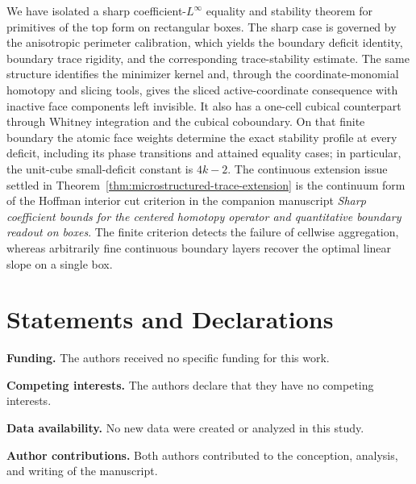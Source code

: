 \documentclass[11pt,letterpaper]{article}
\numberwithin{equation}{section}
\theoremstyle{plain}
\theoremstyle{definition}
\theoremstyle{remark}
\begin{document}
We have isolated a sharp coefficient-$L^\infty$ equality and stability theorem
for primitives of the top form on rectangular boxes. The sharp case is governed
by the anisotropic perimeter calibration, which yields the boundary deficit
identity, boundary trace rigidity, and the corresponding trace-stability
estimate. The same structure identifies the minimizer kernel and, through the
coordinate-monomial homotopy and slicing tools, gives the sliced
active-coordinate consequence with inactive face components left invisible. It
also has a one-cell cubical counterpart through Whitney integration and the
cubical coboundary. On that finite boundary the atomic face weights determine
the exact stability profile at every deficit, including its phase transitions
and attained equality cases; in particular, the unit-cube small-deficit
constant is $4k-2$.  The continuous extension issue settled in
Theorem~\ref{thm:microstructured-trace-extension} is the continuum form of the
Hoffman interior cut criterion in the companion manuscript
\emph{Sharp coefficient bounds for the centered homotopy operator and
quantitative boundary readout on boxes}.  The finite criterion detects the
failure of cellwise aggregation, whereas arbitrarily fine continuous boundary
layers recover the optimal linear slope on a single box.

\section*{Statements and Declarations}

\noindent\textbf{Funding.} The authors received no specific funding for this work.

\noindent\textbf{Competing interests.} The authors declare that they have no competing interests.

\noindent\textbf{Data availability.} No new data were created or analyzed in this study.

\noindent\textbf{Author contributions.} Both authors contributed to the conception, analysis, and writing of the manuscript.




\end{document}
